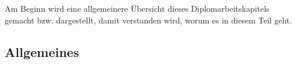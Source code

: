 \chapter{\docname}
\label{\docname}
Am Beginn wird eine allgemeinere Übersicht dieses Diplomarbeitskapitels gemacht bzw. dargestellt, damit verstanden wird, worum es in diesem Teil geht.
\section{Allgemeines}


